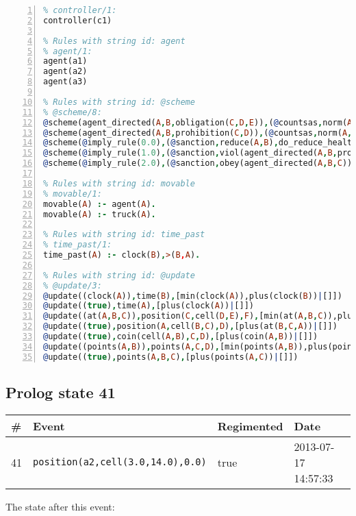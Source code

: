 \documentclass[11pt]{article}\usepackage[utf8]{inputenc}\usepackage{geometry}
\begin{document}
\begin{lstlisting}[language=Prolog, numbers=left]
% Rules with string id: controller
% controller/1:
controller(c1)

% Rules with string id: agent
% agent/1:
agent(a1)
agent(a2)
agent(a3)

% Rules with string id: @scheme
% @scheme/8:
@scheme(agent_directed(A,B,obligation(C,D,E)),(@countsas,norm(A,B,F,obligation(C,D,E)),F),false,(listTrue(C)),(time_past(D)),false,[plus(viol(agent_directed(A,B,obligation(C,D,E))))|[]],[plus(obey(agent_directed(A,B,obligation(C,D,E))))|[]])
@scheme(agent_directed(A,B,prohibition(C,D)),(@countsas,norm(A,B,E,prohibition(C,D)),E),(listTrue(C)),false,(false),false,[plus(viol(agent_directed(A,B,prohibition(C,D))))|[]],[plus(obey(agent_directed(A,B,prohibition(C,D))))|[]])
@scheme(@imply_rule(0.0),(@sanction,reduce(A,B),do_reduce_health(A,B),notifyAgent(A,changed(status))),true,false,false,false,[min(reduce(A,B))|[]],[])
@scheme(@imply_rule(1.0),(@sanction,viol(agent_directed(A,B,prohibition(C,D))),do_sanction(D)),true,false,false,false,[min(viol(agent_directed(A,B,prohibition(C,D))))|[]],[])
@scheme(@imply_rule(2.0),(@sanction,obey(agent_directed(A,B,C))),true,false,false,false,[min(obey(agent_directed(A,B,C)))|[]],[])

% Rules with string id: movable
% movable/1:
movable(A) :- agent(A).
movable(A) :- truck(A).

% Rules with string id: time_past
% time_past/1:
time_past(A) :- clock(B),>(B,A).

% Rules with string id: @update
% @update/3:
@update((clock(A)),time(B),[min(clock(A)),plus(clock(B))|[]])
@update((true),time(A),[plus(clock(A))|[]])
@update((at(A,B,C)),position(C,cell(D,E),F),[min(at(A,B,C)),plus(at(D,E,C))|[]])
@update((true),position(A,cell(B,C),D),[plus(at(B,C,A))|[]])
@update((true),coin(cell(A,B),C,D),[plus(coin(A,B))|[]])
@update((points(A,B)),points(A,C,D),[min(points(A,B)),plus(points(A,D))|[]])
@update((true),points(A,B,C),[plus(points(A,C))|[]])

\end{lstlisting}
\clearpage 
\subsection{Prolog state 41}
\begin{table}[ht]
\centering 
\begin{tabular}{l l l l} 
\textbf{\#} & \textbf{Event} & \textbf{Regimented} & \textbf{Date} \\ [0.5ex] 
\hline
41&\texttt{position(a2,cell(3.0,14.0),0.0)}&true&2013-07-17 14:57:33\\ [1ex] \hline\end{tabular}
\end{table}
The state after this event:
\end{document}
